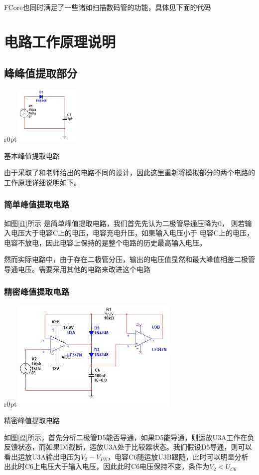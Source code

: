 \documentclass[UTF8,a4paper]{paper}
\begin{document}
FCore也同时满足了一些诸如扫描数码管的功能，具体见下面的代码



\section{电路工作原理说明}
\subsection{峰峰值提取部分}
\begin {wrapfigure}{r}{0pt}
\includegraphics [width=30mm]{f1.jpg}
\caption{基本峰值提取电路}
\label{f1}
\end {wrapfigure}

由于采取了和老师给出的电路不同的设计，因此这里重新将模拟部分的两个电路的工作原理详细说明如下。

\subsubsection{简单峰值提取电路}

如图\ref{f1}所示
是简单峰值提取电路，我们首先先认为二极管导通压降为0，
则若输入电压大于电容C上的电压，电容充电升压，如果输入电压小于
电容C上的电压，电容不放电，因此电容上保持的是整个电路的历史最高输入电压。

然而实际电路中，由于存在二极管分压，输出的电压值显然和最大峰值相差二极管导通电压。需要采用其他的电路来改进这个电路

\subsubsection{精密峰值提取电路}

\begin {wrapfigure}{r}{0pt}
\includegraphics [width=80mm]{f2.jpg}
\caption{精密峰值提取电路}
\label{f2}
\end {wrapfigure}
如图\ref{f2}所示，首先分析二极管D5能否导通，如果D5能导通，则运放U3A工作在负反馈状态，而如果D5截断，运放U3A处于比较器状态。我们假设D5导通，则可以看出运放U3A输出电压为$V_2-V_{PN}$，电容C6随运放U3B跟随，此时可以明显分析出此时C6上电压大于输入电压，因此此时C6电压保持不变，条件为$V_2<U_{C6}$
\end{document}
